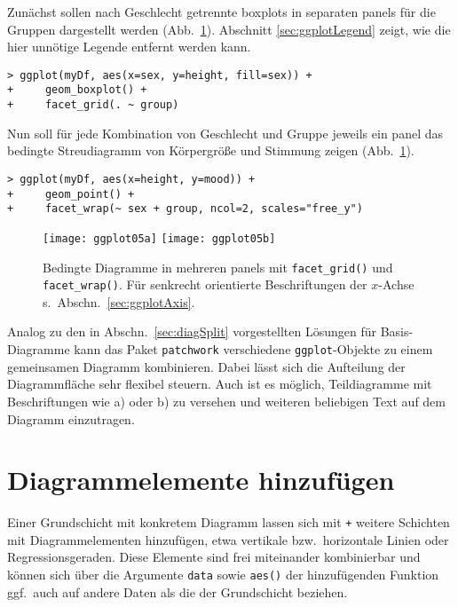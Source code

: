 Zunächst sollen nach Geschlecht getrennte boxplots in separaten panels für die Gruppen dargestellt werden (Abb.\ \ref{fig:ggplot05}). Abschnitt \ref{sec:ggplotLegend} zeigt, wie die hier unnötige Legende entfernt werden kann.
\begin{lstlisting}
> ggplot(myDf, aes(x=sex, y=height, fill=sex)) +
+     geom_boxplot() +
+     facet_grid(. ~ group)
\end{lstlisting}

Nun soll für jede Kombination von Geschlecht und Gruppe jeweils ein panel das bedingte Streudiagramm von Körpergröße und Stimmung zeigen (Abb.\ \ref{fig:ggplot05}).
\begin{lstlisting}
> ggplot(myDf, aes(x=height, y=mood)) +
+     geom_point() +
+     facet_wrap(~ sex + group, ncol=2, scales="free_y")
\end{lstlisting}

\begin{figure}[ht]
\centering
\texttt{[image: ggplot05a]}
\texttt{[image: ggplot05b]}
\vspace*{-0.5em}
\caption{Bedingte Diagramme in mehreren panels mit \lstinline!facet_grid()! und \lstinline!facet_wrap()!. Für senkrecht orientierte Beschriftungen der $x$-Achse s.\ Abschn.\ \ref{sec:ggplotAxis}.}
\label{fig:ggplot05}
\end{figure}

Analog zu den in Abschn.\ \ref{sec:diagSplit} vorgestellten Lösungen für Basis-Diagramme kann das Paket  \lstinline!patchwork! \cite{Pedersen2019} verschiedene \lstinline!ggplot!-Objekte zu einem gemeinsamen Diagramm kombinieren. Dabei lässt sich die Aufteilung der Diagrammfläche sehr flexibel steuern. Auch ist es möglich, Teildiagramme mit Beschriftungen wie a) oder b) zu versehen und weiteren beliebigen Text auf dem Diagramm einzutragen.

\section{Diagrammelemente hinzufügen}
\label{sec:ggplotAddElem}

Einer Grundschicht mit konkretem Diagramm lassen sich mit \lstinline!+! weitere Schichten mit Diagrammelementen hinzufügen, etwa vertikale bzw.\ horizontale Linien oder Regressionsgeraden. Diese Elemente sind frei miteinander kombinierbar und können sich über die Argumente \lstinline!data! sowie \lstinline!aes()! der hinzufügenden Funktion ggf.\ auch auf andere Daten als die der Grundschicht beziehen.

